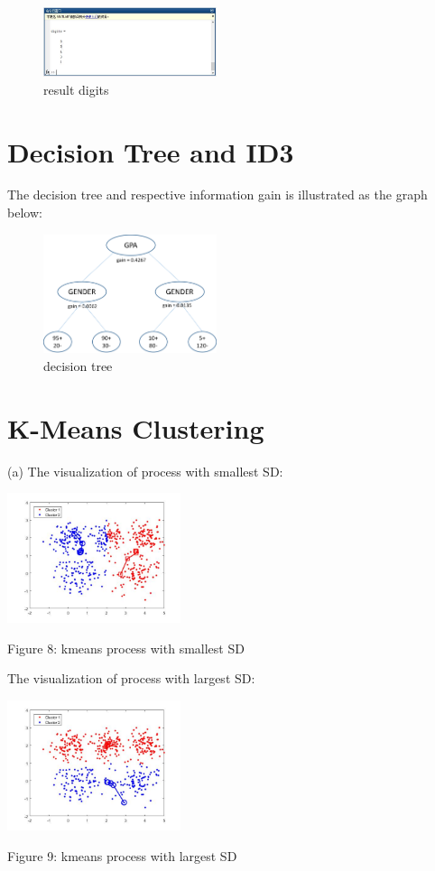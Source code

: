 \documentclass[11pt]{article} %
\begin{document}
\begin{figure}
\centering
\includegraphics[width=2in]{knn_resultdigits.jpg}  %
\caption{result digits}
\label{fig6}
\end{figure}


\section{Decision Tree and ID3}
The decision tree and respective information gain is illustrated as the graph below:

\begin{figure}[h]
\centering
\includegraphics[width=2in]{tree.png}  %
\caption{decision tree}
\label{fig7}
\end{figure}

\section{K-Means Clustering}

(a) The visualization of process with smallest SD:
\begin{center}
\includegraphics[width=2in]{kmeans_min.jpg}  %

Figure 8: kmeans process with smallest SD
\end{center}



The visualization of process with largest SD:
\begin{center}
\includegraphics[width=2in]{kmeans_max.jpg}  %

Figure 9: kmeans process with largest SD
\end{center}
\end{document}
